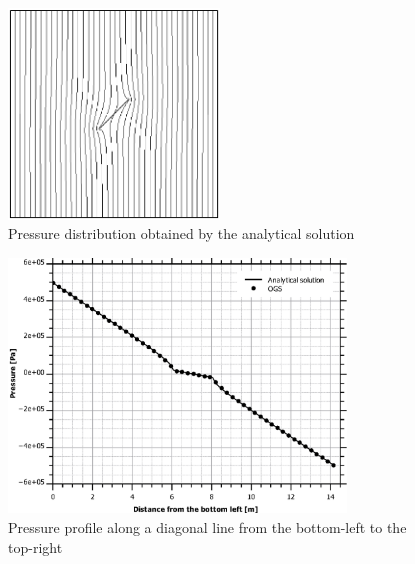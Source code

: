 \begin{figure}[htb]
\centering
\includegraphics[width=0.5\textwidth]{Chapter5/figure/Hmf_uniform_flow_pressure}
\caption{Pressure distribution obtained by the analytical solution}
\label{fig:Hmf_pressure_dis}
\end{figure}


\begin{figure}[htb]
\centering
\includegraphics[width=0.8\textwidth]{Chapter5/figure/Hmf_uniform_flow_a45-cross-profile}
\caption{Pressure profile along a diagonal line from the bottom-left to the top-right}
\label{fig:Hmf_pressure_cross}
\end{figure}
